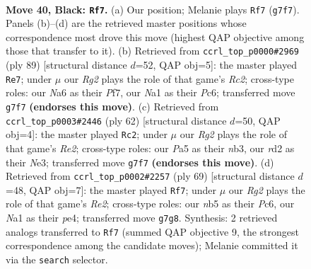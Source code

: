 \documentclass[11pt]{article}
\begin{document}
\clearpage

\begin{figure}[p]\centering
\begin{subfigure}{0.46\textwidth}\centering
\resizebox{\linewidth}{!}{%
\newchessgame
\chessboard[
  setfen={5k2/1p2p1rp/n5p1/pNp5/5P1P/2P2P2/P2R4/n1B2K2 b - - 6 40},
  showmover=false,
  pgfstyle=straightmove, color=movearrow, markmove={g7-f7}
]}
\caption{}
\end{subfigure}\hfill
\begin{subfigure}{0.46\textwidth}\centering
\resizebox{\linewidth}{!}{%
\newchessgame
\chessboard[
  setfen={8/ppr2pk1/2p3p1/2n5/6PP/P1P5/1P2BK2/3R4 b - - 0 45},
  showmover=false,
  pgfstyle=straightmove, color=movearrow, markmove={c7-e7}
]}
\caption{}
\end{subfigure}
\\[4pt]
\begin{subfigure}{0.46\textwidth}\centering
\resizebox{\linewidth}{!}{%
\newchessgame
\chessboard[
  setfen={2r5/r4ppk/3Rp3/7p/p4P1P/Pn2N1P1/4RPK1/8 w - - 2 32},
  showmover=false,
  pgfstyle=straightmove, color=movearrow, markmove={e2-c2}
]}
\caption{}
\end{subfigure}\hfill
\begin{subfigure}{0.46\textwidth}\centering
\resizebox{\linewidth}{!}{%
\newchessgame
\chessboard[
  setfen={5k2/1pn1r2p/p1p1p1p1/4P1P1/4P2P/1P2K3/1P1R4/5B2 b - - 0 35},
  showmover=false,
  pgfstyle=straightmove, color=movearrow, markmove={e7-f7}
]}
\caption{}
\end{subfigure}
\caption{\textbf{Move 40, Black: \texttt{Rf7}.} (a) Our position; Melanie plays \texttt{Rf7} (\texttt{g7f7}). Panels (b)--(d) are the retrieved master positions whose correspondence most drove this move (highest QAP objective among those that transfer to it). (b) Retrieved from \texttt{ccrl\_top\_p0000\#2969} (ply 89) [structural distance $d$=52, QAP obj=5]: the master played \texttt{Re7}; under $\mu$ our \emph{Rg2} plays the role of that game's \emph{Rc2}; cross-type roles: our \emph{N}a6 as their \emph{P}f7, our \emph{N}a1 as their \emph{P}c6; transferred move \texttt{g7f7} \textbf{(endorses this move)}. (c) Retrieved from \texttt{ccrl\_top\_p0003\#2446} (ply 62) [structural distance $d$=50, QAP obj=4]: the master played \texttt{Rc2}; under $\mu$ our \emph{Rg2} plays the role of that game's \emph{Re2}; cross-type roles: our \emph{P}a5 as their \emph{n}b3, our \emph{r}d2 as their \emph{N}e3; transferred move \texttt{g7f7} \textbf{(endorses this move)}. (d) Retrieved from \texttt{ccrl\_top\_p0002\#2257} (ply 69) [structural distance $d$=48, QAP obj=7]: the master played \texttt{Rf7}; under $\mu$ our \emph{Rg2} plays the role of that game's \emph{Re2}; cross-type roles: our \emph{n}b5 as their \emph{P}c6, our \emph{N}a1 as their \emph{p}e4; transferred move \texttt{g7g8}. Synthesis: 2 retrieved analogs transferred to \texttt{Rf7} (summed QAP objective 9, the strongest correspondence among the candidate moves); Melanie committed it via the \texttt{search} selector.}
\label{fig:thought-m79}
\end{figure}
\end{document}
